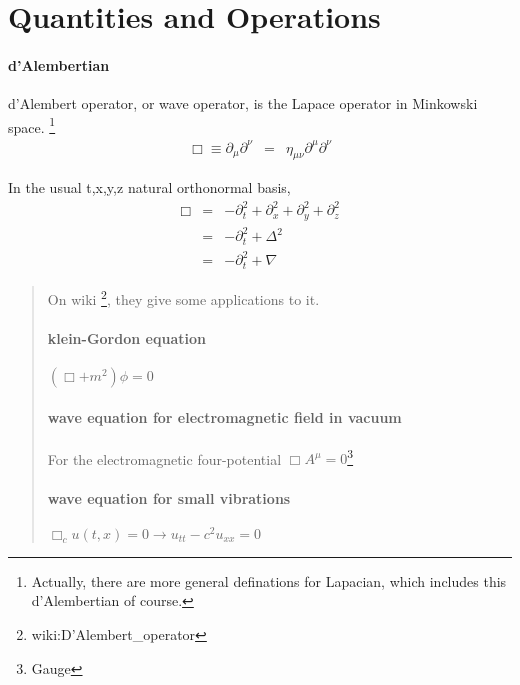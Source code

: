 \documentclass[12pt,a4paper]{book}
\begin{document}
\section{Quantities and Operations}

\paragraph{d'Alembertian}
d'Alembert operator, or wave operator, is the Lapace operator in Minkowski space.
\footnote{Actually, there are more general definations for Lapacian, which includes this d'Alembertian of course.}
\begin{eqnarray}
\Box\equiv \partial_\mu\partial^\nu&=&\eta_{\mu\nu}\partial^\mu \partial^\nu
\end{eqnarray}

In the usual {t,x,y,z} natural orthonormal basis,
\begin{eqnarray}
 \Box&=&-\partial_t^2+\partial_x^2+\partial_y^2+\partial_z^2 \\
&=&-\partial_t^2+\Delta^2 \\
&=&-\partial_t^2+\nabla
\end{eqnarray}

\begin{quotation}
On wiki \footnote{wiki:D'Alembert\_operator}, they give some applications to it.
\paragraph{klein-Gordon equation} $(\Box+m^2)\phi=0$
\paragraph{wave equation for electromagnetic field in vacuum} For the electromagnetic four-potential $\Box A^\mu=0$\footnote{Gauge}
\paragraph{wave equation for small vibrations} $\Box_c u(t,x)=0\rightarrow u_{tt}-c^2 u_{xx}=0$
\end{quotation}







\end{document}
